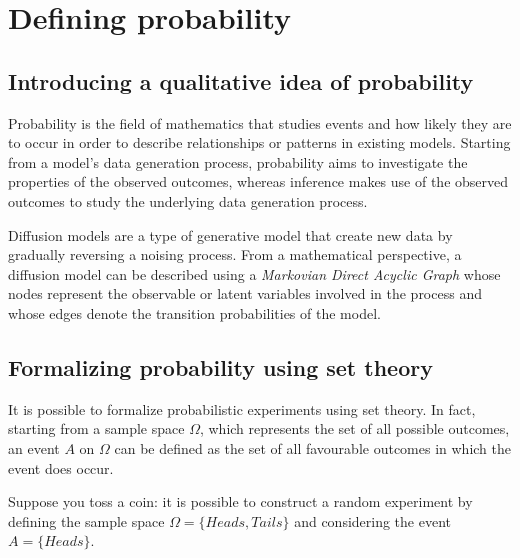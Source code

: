 \documentclass{report}
\begin{document}
\tableofcontents

\chapter{Defining probability}
\section{Introducing a qualitative idea of probability}
Probability is the field of mathematics that studies events and how likely they are to occur in order to describe relationships or patterns in existing models. \newline
Starting from a model's data generation process, probability aims to investigate the properties of the observed outcomes, whereas inference makes use of the observed outcomes to study the underlying data generation process.
\begin{examplebox}
    Diffusion models are a type of generative model that create new data by gradually reversing a noising process. \newline
    From a mathematical perspective, a diffusion model can be described using a \textit{Markovian Direct Acyclic Graph} whose nodes represent the observable or latent variables involved in the process and whose edges denote the transition probabilities of the model.
\end{examplebox}
\section{Formalizing probability using set theory}
It is possible to formalize probabilistic experiments using set theory. \newline
In fact, starting from a sample space $\displaystyle \Omega$, which represents the set of all possible outcomes, an event $\displaystyle A$ on $\displaystyle \Omega$ can be defined as the set of all favourable outcomes in which the event does occur.
\begin{examplebox}
    Suppose you toss a coin: it is possible to construct a random experiment by defining the sample space $\displaystyle \Omega = \{Heads, Tails\}$ and considering the event $\displaystyle A = \{Heads\}$.
\end{examplebox}
\end{document}
